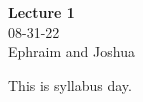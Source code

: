 



\begin{center}
	{\large \bf Lecture 1}   \\ \large 08-31-22 \\ Ephraim and Joshua
\end{center}

This is syllabus day.






